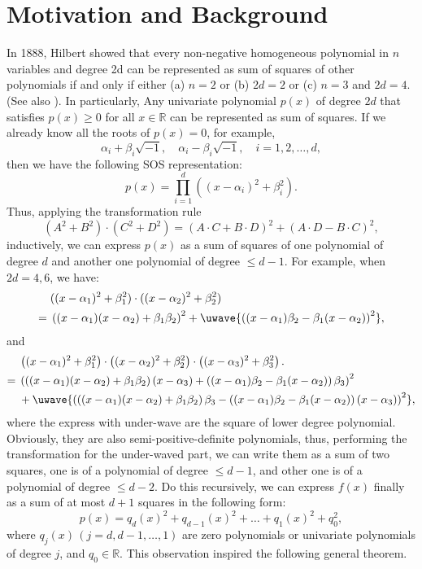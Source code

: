 \documentclass[runningheads]{llncs}
\begin{document}
\section{Motivation and Background}
\label{introduction}

In 1888, Hilbert \cite{Hilbert1888} showed that every non-negative homogeneous polynomial in $n$ variables and degree 2d can be represented as sum of squares of other polynomials if and only if either (a) $n = 2$ or (b) $2d = 2$ or (c) $n = 3$ and $2d = 4$. (See also \cite{Hilbert1893,Hilbert1910,Artin1927}). 
In particularly, Any univariate polynomial $p(x)$ of degree $2d$ that satisfies $p(x)\geq 0$ for all $x\in \mathbb{R}$ can be represented as sum of squares. 
If we already know all the roots of \( p(x) = 0 \), for example,  
\[
\alpha_i + \beta_i\sqrt{-1}, \quad \alpha_i - \beta_i\sqrt{-1}, \quad i = 1,2,\ldots,d,
\]  
then we have the following SOS representation:  
\[
p(x) = \prod_{i=1}^{d} \left( (x - \alpha_i)^2 + \beta_i^2 \right).
\]
Thus, applying the transformation rule  
\begin{equation}
(A^2 + B^2) \cdot (C^2 + D^2) = (A \cdot C + B \cdot D)^2 + (A \cdot D - B \cdot C)^2,
\label{tr-1}
\end{equation} 
inductively, we can express \( p(x) \) as a sum of squares of one polynomial of degree $d$ and another one polynomial of degree $\leq d-1$.  For example, when \( 2d = 4, 6 \), we have:  
\begin{align}
&\;((x-\alpha_1)^2+\beta_1^2) \cdot ((x-\alpha_2)^2+\beta_2^2) \nonumber \\
=&\; \left( (x - \alpha_1)(x - \alpha_2) + \beta_1 \beta_2 \right)^2 
+ \uwave{\left( (x - \alpha_1) \beta_2 - \beta_1 (x - \alpha_2) \right)^2}, 
\label{eq-2}
\end{align}
and
\begin{align}
&\;\left( (x - \alpha_1)^2 + \beta_1^2 \right) \cdot \left( (x - \alpha_2)^2 + \beta_2^2 \right) \cdot \left( (x - \alpha_3)^2 + \beta_3^2 \right).\nonumber\\
=&\;\left( \left( (x - \alpha_1)(x - \alpha_2) + \beta_1 \beta_2 \right)(x - \alpha_3) + \left( (x - \alpha_1)\beta_2 - \beta_1 (x - \alpha_2) \right) \beta_3 \right)^2 \nonumber \\
&\;+ \uwave{\left( \left( (x - \alpha_1)(x - \alpha_2) + \beta_1 \beta_2 \right) \beta_3 - \left( (x - \alpha_1)\beta_2 - \beta_1 (x - \alpha_2) \right)(x - \alpha_3) \right)^2},
\label{eq-3}
\end{align}
where the express with under-wave are the square of lower degree polynomial. Obviously, they are also semi-positive-definite polynomials, thus, performing the transformation for the under-waved part, we can write them as a sum of two squares, one is of a polynomial of degree $\leq d-1$,  and other one is of a polynomial of degree $\leq d-2$. Do this recursively, we can express $f(x)$ finally as a sum of at most $d+1$ squares in the following form:
$$
p(x)=q_d(x)^2+q_{d-1}(x)^2+\ldots+q_1(x)^2+q_0^2,
$$
where $q_j(x)\,(j=d,d-1,\ldots,1)$ are zero polynomials or univariate polynomials of degree $j$, and $q_0\in \mathbb{R}$. This observation inspired the following general theorem.
\end{document}
